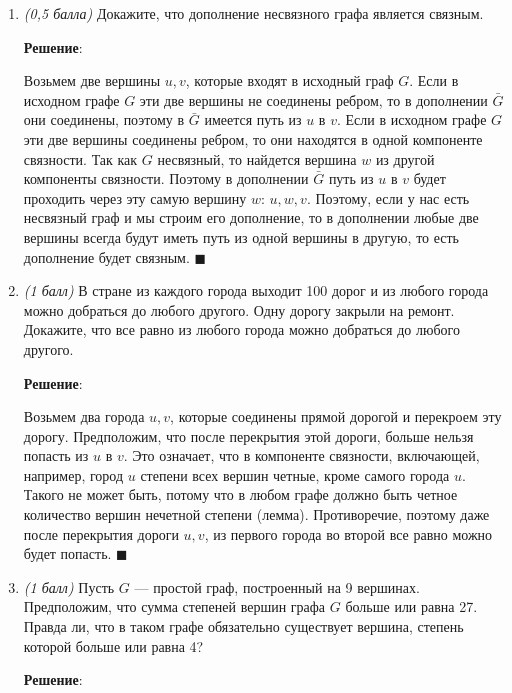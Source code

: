 \documentclass{article}
\begin{document}
\begin{enumerate}

    \item \textit{(0,5 балла)} Докажите, что дополнение несвязного графа является связным.
    
    \textbf{Решение}:

    Возьмем две вершины $u, v$, которые входят в исходный граф $G$. Если в исходном графе $G$ эти две вершины не соединены ребром, то в дополнении $\bar{G}$ они соединены, поэтому в $\bar{G}$ имеется путь из $u$ в $v$. Если в исходном графе $G$ эти две вершины соединены ребром, то они находятся в одной компоненте связности. Так как $G$ несвязный, то найдется вершина $w$ из другой компоненты связности. Поэтому в дополнении $\bar{G}$ путь из $u$ в $v$ будет проходить через эту самую вершину $w$: $u, w, v$. Поэтому, если у нас есть несвязный граф и мы строим его дополнение, то в дополнении любые две вершины всегда будут иметь путь из одной вершины в другую, то есть дополнение будет связным. $\blacksquare$

    \item \textit{(1 балл)} В стране из каждого города выходит 100 дорог и из любого города можно добраться до любого другого. Одну дорогу закрыли на ремонт. Докажите, что все равно из любого города можно добраться до любого другого.
    
    \textbf{Решение}:

    Возьмем два города $u, v$, которые соединены прямой дорогой и перекроем эту дорогу. Предположим, что после перекрытия этой дороги, больше нельзя попасть из $u$ в $v$. Это означает, что в компоненте связности, включающей, например, город $u$ степени всех вершин четные, кроме самого города $u$. Такого не может быть, потому что в любом графе должно быть четное количество вершин нечетной степени (лемма). Противоречие, поэтому даже после перекрытия дороги $u, v$, из первого города во второй все равно можно будет попасть. $\blacksquare$
    
    \item \textit{(1 балл)} Пусть $G$ --- простой граф, построенный на 9 вершинах. Предположим, что сумма степеней вершин графа $G$ больше или равна 27. Правда ли, что в таком графе обязательно существует вершина, степень которой больше или равна 4?
    
    \textbf{Решение}:


\end{enumerate}
\end{document}
